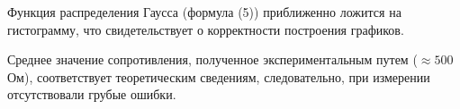 \documentclass[a4paper,12pt]{article}
\begin{document}
        Функция распределения Гаусса (формула (5)) приближенно ложится на гистограмму, что свидетельствует о корректности построения графиков.

        Среднее значение сопротивления, полученное экспериментальным путем ($\approx 500$ Ом), соответствует теоретическим сведениям, следовательно, при измерении отсутствовали грубые ошибки.
	
\end{document}
